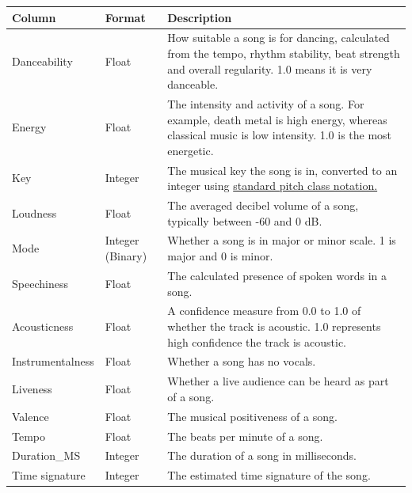 \documentclass[12pt]{report}
\begin{document}
\begin{table}[H]
    \centering
        \begin{tabular}{ |p{}|p{}| p{}|}
            \hline
            \cellcolor{blue!25}Column & \cellcolor{blue!25}Format & \cellcolor{blue!25}Description\\
            \hline
            Danceability & Float & How suitable a song is for dancing, calculated from the tempo, rhythm stability, beat strength and overall regularity. 1.0 means it is very danceable. \\
            \hline
            Energy & Float & The intensity and activity of a song. For example, death metal is high energy, whereas classical music is low intensity. 1.0 is the most energetic.\\
            \hline
            Key & Integer & The musical key the song is in, converted to an integer using \href{https://smbutterfield.github.io/ibmt17-18/22-intro-to-non-diatonic-materials/b2-tx-pcintnotation.html}{standard pitch class notation.}\autocite{butterfield_22b_nodate} \\
            \hline
            Loudness & Float & The averaged decibel volume of a song, typically between -60 and 0 dB.\\
            \hline
            Mode & Integer (Binary) & Whether a song is in major or minor scale. 1 is major and 0 is minor.\\
            \hline
            Speechiness & Float & The calculated presence of spoken words in a song.\\
            \hline
            Acousticness & Float & A confidence measure from 0.0 to 1.0 of whether the track is acoustic. 1.0 represents high confidence the track is acoustic.\\
            \hline
            Instrumentalness & Float & Whether a song has no vocals.\\
            \hline
            Liveness & Float & Whether a live audience can be heard as part of a song.\\
            \hline
            Valence & Float & The musical positiveness of a song.\\
            \hline
            Tempo & Float & The beats per minute of a song.\\
            \hline
            Duration\_MS & Integer & The duration of a song in milliseconds.\\
            \hline
            Time signature & Integer & The estimated time signature of the song.\\

\end{tabular}
\end{table}
\end{document}
